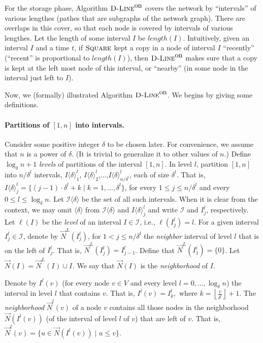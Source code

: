 \documentclass[11pt]{article}
\newcommand{\neigh}[0]{N}
\newcommand{\Inter}[2]{{I^{#1}_{#2}}}
\newcommand{\Interk}[2]{{I^{#2}(#1)}}
\newcommand{\lfun}[1]{\ell(#1)}
\newcommand{\calI}{\mathcal{I}}
\newcommand{\Square}[0]{\mbox{\sc Square}}
\newcommand{\Dlineon}[0]{\mbox{{\sc D-Line}}^{\mbox{\upshape on}}}
\newcommand{\NID}[2]{\overrightarrow{\neigh}^{#1}(#2)}
\newcommand{\NDI}[1]{\overrightarrow{\neigh}(#1)}
\newcommand{\DNLI}[1]{\overrightarrow{\neigh}^{L}(#1)}
\newcommand{\Jnter}[3]{I\langle#1\rangle_{#2}^{#3}}
\begin{document}
For the storage phase, Algorithm $\Dlineon$ covers the network by ``intervals'' of various lengthes (pathes that are subgraphs of the network graph).
There are overlaps in this cover, so that each node is covered by intervals of various lengthes.
Let the length of some interval $I$ be $length(I)$.
Intuitively, given an interval $I$ and a time $t$,
if $\Square$ kept a copy in a node of interval $I$ ``recently'' (``recent'' is proportional to $length(I)$),
then $\Dlineon$ makes sure that a copy is kept at the left most node of this interval, or ``nearby''
(in some node in the interval just left to $I$).


Now, we (formally) illustrated Algorithm $\Dlineon$. We begins by giving some definitions.










\paragraph*{\bf Partitions of $[1,n]$ into intervals\commsingle.\commsingleend}
Consider some positive integer $\delta$ to be chosen later.
For convenience, we assume that $n$ is a power of $\delta$.
(It is trivial to generalize it to other values of $n$.)
Define $\log_\delta n+1$ {\em levels} of partitions of the interval $[1,n]$.
In level $l$, partition $[1,n]$ into $n/\delta^l$ intervals,
$\Jnter{\delta}{1}{l}$, $\Jnter{\delta}{2}{l}$,...,$\Jnter{\delta}{n/\delta^l}{l}$, each of size $\delta^l$.
That is,
$\Jnter{\delta}{j}{l}=\{(j-1)\cdot \delta^l+k\mid k=1,...,\delta^l\}$,
for every $1\leq j \leq n/\delta^{l}$ and every $0\leq l \leq \log_\delta n$.
Let $\calI\langle\delta\rangle$ be the set of all such intervals.
When it is clear from the context, we may omit $\langle\delta\rangle$ from $\calI\langle\delta\rangle$ and $\Jnter{\delta}{j}{l}$ and write $\calI$ and $\Inter{l}{j}$, respectively.
Let $\lfun{I}$ be the {\em level} of an interval $I\in\calI$, i.e., $\lfun{\Inter{l}{j}}=l$.
For a given interval $\Inter{l}{j}\in\calI$,
denote by $\DNLI{\Inter{l}{j}}$, for $1< j\leq n/\delta^l$ the {\em neighbor} interval of level $l$ that is on the left of $\Inter{l}{j}$.
That is, $\DNLI{\Inter{l}{j}}=\Inter{l}{j-1}$. Define that $\DNLI{\Inter{i}{1}}=\{0\}$. Let
$\NDI{\Inter{}{}}=
\DNLI{\Inter{}{}}\cup \Inter{}{}.
$
We say that $\NDI{I}$ is the {\em neighborhood } of $I$.



Denote by $\Interk{v}{l}$ (for every node $v\in V$ and every level $l=0,..., \log_\delta n$) the  interval in level $l$ that contains $v$.
That is,
$\Interk{v}{l}=\Inter{l}{k}, \mbox{ where } k=\left\lfloor\frac{v}{\delta^l}\right\rfloor+1$.
The {\em neighborhood} $\NID{l}{v}$ of a node $v$ contains all those nodes in the neighborhood $\NDI{\Interk{v}{l}}$
(of the interval of level $l$ of $v$) that are left of $v$.
That is, $\NID{l}{v}=\{u\in\NDI{I^l(v)}\mid u\leq v\}$.
\end{document}
